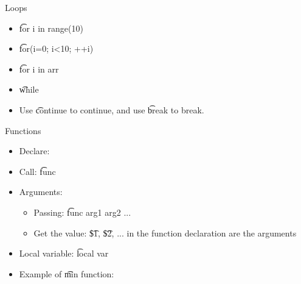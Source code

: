\begin{frame}[fragile]{Loops}
\begin{multicols}{2}
\begin{itemize}
\item \t{for i in range(10)}

\item \t{for(i=0; i<10; ++i)}

\newpage
\item \t{for i in arr}

\item \t{while}

\item Use \t{continue} to continue, and use \t{break} to break.
\end{itemize}
\end{multicols}
\end{frame}

\begin{frame}{Functions}
\begin{multicols}{2}
\begin{itemize}
\item Declare:

\item Call: \t{func}
\item Arguments:
\begin{itemize}
\item Passing: \t{func arg1 arg2 ...}
\item Get the value: \t{\$1}, \t{\$2}, ... in the function declaration are the arguments
\end{itemize}
\item Local variable: \t{local var}
\newpage
\item Example of \t{min} function:

\end{itemize}
\end{multicols}
\end{frame}
